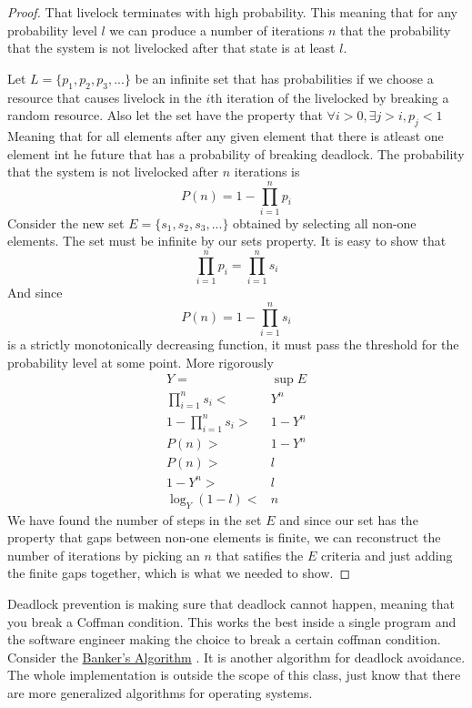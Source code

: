 \begin{proof} 
That livelock terminates with high probability. This meaning that for any probability level $l$ we can produce a number of iterations $n$ that the probability that the system is not livelocked after that state is at least $l$.

Let $L = \{p_1, p_2, p_3, ...\}$ be an infinite set that has probabilities if we choose a resource that causes livelock in the $i$th iteration of the livelocked by breaking a random resource. Also let the set have the property that $\forall i > 0, \exists j > i, p_j < 1$ Meaning that for all elements after any given element that there is atleast one element int he future that has a probability of breaking deadlock. The probability that the system is not livelocked after $n$ iterations is
\[
P(n) = 1 - \prod\limits_{i = 1}^{n}p_i
\]
Consider the new set $E = \{s_1, s_2, s_3, ...\}$ obtained by selecting all non-one elements. The set must be infinite by our sets property. It is easy to show that 
\[
\prod\limits_{i = 1}^{n}p_i = \prod\limits_{i = 1}^{n}s_i
\]
And since
\[
P(n) = 1 - \prod\limits_{i = 1}^{n}s_i
\]
is a strictly monotonically decreasing function, it must pass the threshold for the probability level at some point. More rigorously
\begin{align*}
Y =& \sup E \\
\prod\limits_{i = 1}^{n}s_i <& Y^n \\
1 - \prod\limits_{i = 1}^{n}s_i >& 1 - Y^n \\
P(n) >& 1 - Y^n \\
P(n) >& l \\
1 - Y^n  >& l \\
\log_Y(1 - l) <& n
\end{align*}
We have found the number of steps in the set $E$ and since our set has the property that gaps between non-one elements is finite, we can reconstruct the number of iterations by picking an $n$ that satifies the $E$ criteria and just adding the finite gaps together, which is what we needed to show.
\end{proof}

Deadlock prevention is making sure that deadlock cannot happen, meaning that you break a Coffman condition. This works the best inside a single program and the software engineer making the choice to break a certain coffman condition. Consider the \href{https://en.wikipedia.org/wiki/Banker's_algorithm}{Banker's Algorithm} \cite{Dijkstra:1965:CSP:1102034}. It is another algorithm for deadlock avoidance. The whole implementation is outside the scope of this class, just know that there are more generalized algorithms for operating systems.

